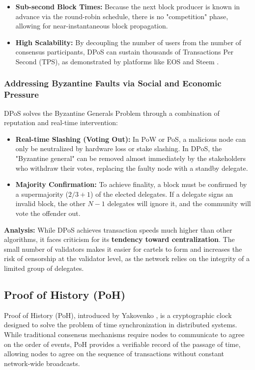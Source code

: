 \begin{itemize}
    \item \textbf{Sub-second Block Times:} Because the next block producer is known in advance via the round-robin schedule, there is no "competition" phase, allowing for near-instantaneous block propagation.
    \item \textbf{High Scalability:} By decoupling the number of users from the number of consensus participants, DPoS can sustain thousands of Transactions Per Second (TPS), as demonstrated by platforms like EOS and Steem \cite{saleh2021blockchain}.
\end{itemize}

\subsubsection{Addressing Byzantine Faults via Social and Economic Pressure}
DPoS solves the Byzantine Generals Problem through a combination of reputation and real-time intervention:
\begin{itemize}
    \item \textbf{Real-time Slashing (Voting Out):} In PoW or PoS, a malicious node can only be neutralized by hardware loss or stake slashing. In DPoS, the "Byzantine general" can be removed almost immediately by the stakeholders who withdraw their votes, replacing the faulty node with a standby delegate.
    \item \textbf{Majority Confirmation:} To achieve finality, a block must be confirmed by a supermajority ($2/3+1$) of the elected delegates. If a delegate signs an invalid block, the other $N-1$ delegates will ignore it, and the community will vote the offender out.
\end{itemize}

\textbf{Analysis:} 
While DPoS achieves transaction speeds much higher than other algorithms, it faces criticism for its \textbf{tendency toward centralization}. The small number of validators makes it easier for cartels to form and increases the risk of censorship at the validator level, as the network relies on the integrity of a limited group of delegates.

\subsection{Proof of History (PoH)}
Proof of History (PoH), introduced by Yakovenko \cite{yakovenko2018poh}, is a cryptographic clock designed to solve the problem of time synchronization in distributed systems. While traditional consensus mechanisms require nodes to communicate to agree on the order of events, PoH provides a verifiable record of the passage of time, allowing nodes to agree on the sequence of transactions without constant network-wide broadcasts.

